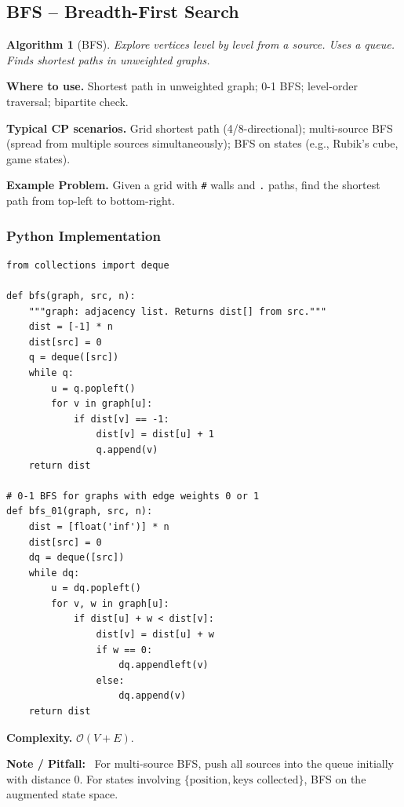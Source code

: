 \documentclass[10pt,a4paper]{article}
\theoremstyle{cpstyle}
\newtheorem{algorithm}[theorem]{Algorithm}
\newenvironment{cpnote}{%
  \begin{mdframed}[backgroundcolor=notebg, linecolor=orange!70, linewidth=1pt,
    innerleftmargin=10pt, innerrightmargin=10pt, innertopmargin=6pt, innerbottommargin=6pt]
  \textbf{\color{orange!80!black}Note / Pitfall:}~}{%
  \end{mdframed}}
\newcommand{\bigO}[1]{\mathcal{O}\!\left(#1\right)}
\begin{document}
\subsection{BFS -- Breadth-First Search}

\begin{algorithm}[BFS]
Explore vertices level by level from a source. Uses a queue. Finds shortest paths in unweighted graphs.
\end{algorithm}

\textbf{Where to use.} Shortest path in unweighted graph; 0-1 BFS; level-order traversal; bipartite check.

\textbf{Typical CP scenarios.} Grid shortest path (4/8-directional); multi-source BFS (spread from multiple sources simultaneously); BFS on states (e.g., Rubik's cube, game states).

\textbf{Example Problem.} Given a grid with \texttt{\#} walls and \texttt{.} paths, find the shortest path from top-left to bottom-right.

\subsubsection{Python Implementation}
\begin{lstlisting}[caption={BFS -- shortest paths}]
from collections import deque

def bfs(graph, src, n):
    """graph: adjacency list. Returns dist[] from src."""
    dist = [-1] * n
    dist[src] = 0
    q = deque([src])
    while q:
        u = q.popleft()
        for v in graph[u]:
            if dist[v] == -1:
                dist[v] = dist[u] + 1
                q.append(v)
    return dist

# 0-1 BFS for graphs with edge weights 0 or 1
def bfs_01(graph, src, n):
    dist = [float('inf')] * n
    dist[src] = 0
    dq = deque([src])
    while dq:
        u = dq.popleft()
        for v, w in graph[u]:
            if dist[u] + w < dist[v]:
                dist[v] = dist[u] + w
                if w == 0:
                    dq.appendleft(v)
                else:
                    dq.append(v)
    return dist
\end{lstlisting}

\textbf{Complexity.} $\bigO{V + E}$.

\begin{cpnote}
For multi-source BFS, push all sources into the queue initially with distance 0. For states involving $\{\text{position}, \text{keys collected}\}$, BFS on the augmented state space.
\end{cpnote}
\end{document}
